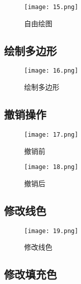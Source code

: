 \documentclass[14pt]{scrartcl} %
\begin{document}
\begin{figure}[h] %
	\centering
	\texttt{[image: 15.png]} %
	\caption{自由绘图}
\end{figure}

\pagebreak

\subsection{绘制多边形}

\begin{figure}[h] %
	\centering
	\texttt{[image: 16.png]} %
	\caption{绘制多边形}
\end{figure}

\subsection{撤销操作}

\begin{figure}[h] %
	\begin{minipage}[t]{0.5\linewidth}
		\centering
		\texttt{[image: 17.png]}
		\caption{撤销前}
	\end{minipage}%
	\begin{minipage}[t]{0.5\linewidth}
		\centering
		\texttt{[image: 18.png]}
		\caption{撤销后}
	\end{minipage}
\end{figure}

\pagebreak
\subsection{修改线色}

\begin{figure}[h] %
	\centering
	\texttt{[image: 19.png]} %
	\caption{修改线色}
\end{figure}

\subsection{修改填充色}
\end{document}
